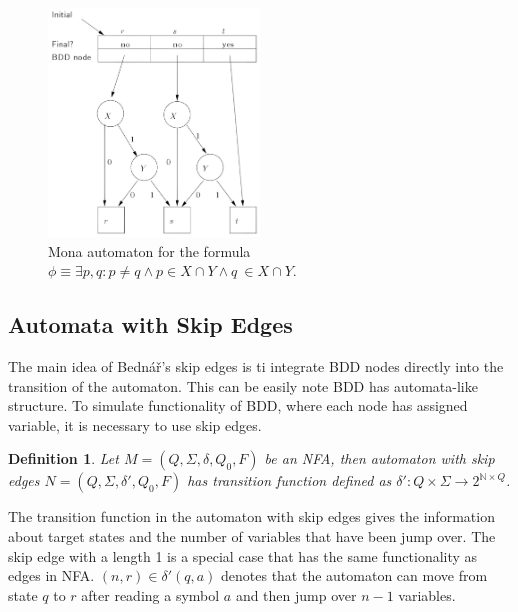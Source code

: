 \documentclass[pdflatex,sn-mathphys-num]{sn-jnl}%
\theoremstyle{thmstyleone}%
\theoremstyle{thmstyletwo}%
\theoremstyle{thmstylethree}%
\newtheorem{definition}{Definition}%
\begin{document}
        \begin{figure}[H]
            \centering
            \includegraphics[width=0.5\textwidth]{Figures/mona_aut.png}
            \vspace*{0.5em}
            \caption{Mona automaton for the formula $\phi \equiv \exists p, q : p \neq q \land p \in X \cap Y \land q \ \in X \cap Y$.}
            \label{fig:mona}
        \end{figure}

        \vspace*{-2em}

    \subsection{Automata with Skip Edges}
        The main idea of Bednář's skip edges \cite{Bednar} is ti integrate BDD nodes directly into the transition of the automaton. This can be easily note BDD has automata-like structure. To simulate functionality of BDD, where each node has assigned variable, it is necessary to use skip edges.

        \vspace*{0.5em}

        \begin{definition}
            Let $M = (Q, \Sigma, \delta, Q_0, F)$ be an NFA, then automaton with skip edges $N = (Q, \Sigma, \delta', Q_0, F)$ has transition function defined as $\delta' : Q \times \Sigma \rightarrow 2^{\mathbb{N} \times Q}$.
        \end{definition}

        \vspace*{0.5em}

        The transition function in the automaton with skip edges gives the information about target states and the number of variables that have been jump over. The skip edge with a length 1 is a special case that has the same functionality as edges in NFA. $(n, r) \in \delta'(q, a)$ denotes that the automaton can move from state $q$ to $r$ after reading a symbol $a$ and then jump over $n-1$ variables.
\end{document}
